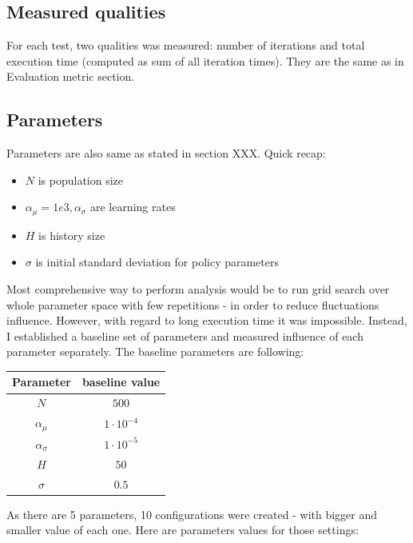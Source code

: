 \documentclass[12pt]{article}
\begin{document}
\subsection{Measured qualities}

For each test, two qualities was measured: number of iterations and total execution time (computed as sum of all iteration times). They are the same as in Evaluation metric section.

\subsection{Parameters}

Parameters are also same as stated in section XXX. Quick recap:

\begin{itemize}
\item $N$ is population size
\item $\alpha_\mu = 1e3, \alpha_\sigma$ are learning rates
\item $H$ is history size
\item $\sigma$ is initial standard deviation for policy parameters

\end{itemize}

Most comprehensive way to perform analysis would be to run grid search over whole parameter space with few repetitions - in order to reduce fluctuations influence. However, with regard to long execution time it was impossible. Instead, I established a baseline set of parameters and measured influence of each parameter separately. The baseline parameters are following:

\begin{tabular}{|c|c|}
\hline 
Parameter & baseline value \\
\hline 
$N$ & $500$ \\
\hline 
$\alpha_\mu$ & $1 \cdot 10^{-4}$ \\
\hline 
$\alpha_\sigma$ & $1 \cdot 10^{-5}$ \\
\hline 
$H$ & $50$ \\
\hline 
$\sigma$ & $0.5$ \\
\hline 
\end{tabular} 

As there are 5 parameters, 10 configurations were created - with bigger and smaller value of each one. Here are parameters values for those settings:
\end{document}

